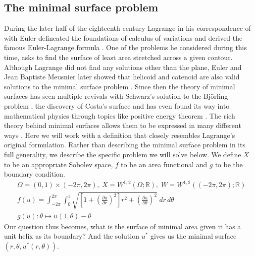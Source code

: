 \subsection{The minimal surface problem} During the later half of the eighteenth century Lagrange in his correspondence of with Euler delineated the foundations of calculus of variations and derived the famous Euler-Lagrange formula \cite{goldstine2012history}. One of the problems he considered during this time, asks to find the surface of least area stretched across a given contour. Although Lagrange did not find any solutions other than the plane, Euler and Jean Baptiste Meusnier later showed that helicoid and catenoid are also valid solutions to the minimal surface problem \cite{meusnier1785memoire}. Since then the theory of minimal surfaces has seen multiple revivals with Schwarz's solution to the Björling problem \cite{darboux1896leccons}, the discovery of Costa's surface \cite{costa1984example} and has even found its way into mathematical physics through topics like positive energy theorem \cite{schoen1979proof}. The rich theory behind minimal surfaces allows them to be expressed in many different ways \cite{colding2011course}. Here we will work with a definition that closely resembles Lagrange's original formulation. Rather than describing the minimal surface problem in its full generality, we describe the specific problem we will solve below. We define $X$ to be an appropriate Sobolev space, $f$ to be an area functional and $g$ to be the boundary condition.
\begin{equation}
\begin{aligned}
    &\Omega=(0,1 )\times(-2\pi, 2\pi),\;X=W^{1, 2}(\Omega;\mathbb R),\; W=W^{1,2}((-2\pi,2\pi);\mathbb R)\\
    &f(u)=\int_{-2\pi}^{2\pi}\int_0^1\sqrt{\left[1+\left(\frac{\partial u}{\partial r}\right)^2\right]r^2+\left(\frac{\partial u}{\partial\theta}\right)^2}\;dr\,d\theta\\
&g(u): \theta \mapsto u(1, \theta) - \theta\label{eq:ms--var-ml}
\end{aligned}    
\end{equation}
Our question thus becomes, what is the surface of minimal area given it has a unit helix as its boundary? And the solution $u^*$ gives us the minimal surface $(r, \theta, u^*(r,\theta))$. 

